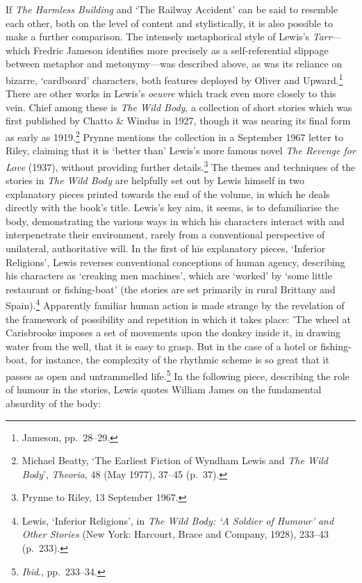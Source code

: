 \documentclass[]{article}
\begin{document}
If \emph{The Harmless Building} and ‘The Railway Accident’ can be said
to resemble each other, both on the level of content and stylistically,
it is also possible to make a further comparison. The intensely
metaphorical style of Lewis’s \emph{Tarr}—which Fredric Jameson
identifies more precisely as a self-referential slippage between
metaphor and metonymy—was described above, as was its reliance on
bizarre, ‘cardboard’ characters, both features deployed by Oliver and
Upward.\footnote{Jameson, pp.~28–29.} There are other works in Lewis’s
\emph{oeuvre} which track even more closely to this vein. Chief among
these is \emph{The Wild Body}, a collection of short stories which was
first published by Chatto \& Windus in 1927, though it was nearing its
final form as early as 1919.\footnote{Michael Beatty, ‘The Earliest
  Fiction of Wyndham Lewis and \emph{The Wild Body}’, \emph{Theoria}, 48
  (May 1977), 37–45 (p.~37).} Prynne mentions the collection in a
September 1967 letter to Riley, claiming that it is ‘better than’
Lewis’s more famous novel \emph{The Revenge for Love} (1937), without
providing further details.\footnote{Prynne to Riley, 13 September 1967.}
The themes and techniques of the stories in \emph{The Wild Body} are
helpfully set out by Lewis himself in two explanatory pieces printed
towards the end of the volume, in which he deals directly with the
book’s title. Lewis’s key aim, it seems, is to defamiliarise the body,
demonstrating the various ways in which his characters interact with and
interpenetrate their environment, rarely from a conventional perspective
of unilateral, authoritative will. In the first of his explanatory
pieces, ‘Inferior Religions’, Lewis reverses conventional conceptions of
human agency, describing his characters as ‘creaking men machines’,
which are ‘worked’ by ‘some little restaurant or fishing-boat’ (the
stories are set primarily in rural Brittany and Spain).\footnote{Lewis,
  ‘Inferior Religions’, in \emph{The Wild Body: ‘A Soldier of Humour’
  and Other Stories} (New York: Harcourt, Brace and Company, 1928),
  233–43 (p.~233).} Apparently familiar human action is made strange by
the revelation of the framework of possibility and repetition in which
it takes place: ’The wheel at Carisbrooke imposes a set of movements
upon the donkey inside it, in drawing water from the well, that it is
easy to grasp. But in the case of a hotel or fishing-boat, for instance,
the complexity of the rhythmic scheme is so great that it passes as open
and untrammelled life.\footnote{\emph{Ibid}., pp.~233–34.} In the
following piece, describing the role of humour in the stories, Lewis
quotes William James on the fundamental absurdity of the body:
\end{document}
